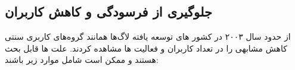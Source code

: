 \subsection{جلوگیری از فرسودگی و کاهش کاربران}

از حدود سال ۲۰۰۳ در کشور های توسعه یافته لاگ‌ها همانند گروه‌های کاربری سنتی
کاهش مشابهی را در تعداد کاربران و فعالیت ها مشاهده کردند. علت ها قابل بحث هستند
و ممکن است شامل موارد زیر باشند:


